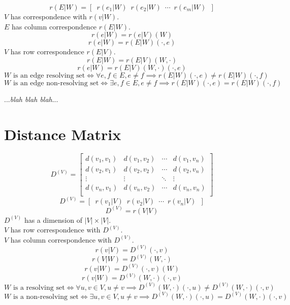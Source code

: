 \documentclass{article}
\begin{document}
	\[ r(E|W) = \left[\enspace r(e_1|W)\enspace r(e_2|W)\enspace \cdots\enspace r(e_m|W)\enspace \right] \]
	\(V\) has correspondence with \(r(v|W)\). \\
	\(E\) has column correspondence \(r(E|W)\).
	\[ r(e|W) = r(e|V)(W) \]
	\[ r(e|W) = r(E|W)(\cdot, e) \]
	\(V\) has row correspondence \(r(E|V)\).
	\[ r(E|W) = r(E|V)(W, \cdot) \]
	\[ r(e|W) = r(E|V)(W, \cdot)(\cdot, e) \]
	\[ W \text{ is an edge resolving set} \iff \forall e, f \in E, e \neq f \implies r(E|W)(\cdot, e) \neq r(E|W)(\cdot, f) \]
	\[ W \text{ is an edge non-resolving set} \iff \exists e, f \in E, e \neq f \implies r(E|W)(\cdot, e) = r(E|W)(\cdot, f) \]

	...\textit{blah blah blah}...

	\clearpage
	\section{Distance Matrix}

	\[
		D^{(V)} = \left[
		\begin{array}{cccc}
			d(v_1, v_1) & d(v_1, v_2) & \cdots & d(v_1, v_n) \\
			d(v_2, v_1) & d(v_2, v_2) & \cdots & d(v_2, v_n) \\
			\vdots & \vdots & \ddots & \vdots \\
			d(v_n, v_1) & d(v_n, v_2) & \cdots & d(v_n, v_n) \\
		\end{array}
		\right]
	\]
	\[ D^{(V)} = \left[\enspace r(v_1|V)\enspace r(v_2|V)\enspace \cdots\enspace r(v_n|V)\enspace \right] \]
	\[ D^{(V)} = r(V|V) \]
	\(D^{(V)}\) has a dimension of \(|V| \times |V|\). \\
	\(V\) has row correspondence with \(D^{(V)}\). \\
	\(V\) has column correspondence with \(D^{(V)}\).
	\[ r(v|V) = D^{(V)}(\cdot, v) \]
	\[ r(V|W) = D^{(V)}(W, \cdot) \]
	\[ r(v|W) = D^{(V)}(\cdot, v)(W) \]
	\[ r(v|W) = D^{(V)}(W, \cdot)(\cdot, v) \]
	\[ W \text{ is a resolving set} \iff \forall u, v \in V, u \neq v \implies D^{(V)}(W, \cdot)(\cdot, u) \neq D^{(V)}(W, \cdot)(\cdot, v) \]
	\[ W \text{ is a non-resolving set} \iff \exists u, v \in V, u \neq v \implies D^{(V)}(W, \cdot)(\cdot, u) = D^{(V)}(W, \cdot)(\cdot, v) \]
\end{document}
